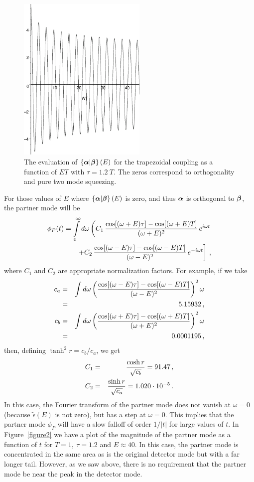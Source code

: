 \documentclass[aps,prd,showpacs,amssymb,nofootinbib,twocolumn]{revtex4}
\newcommand{\scalar}[2]{\left\{#1|#2\right\}}
\newcommand{\nn}{\nonumber\\}
\newcommand{\f}[1]{\mbox{\boldmath$#1$}}
\newcommand{\bea}{\begin{eqnarray}}
\newcommand{\eea}{\end{eqnarray}}
\begin{document}
\begin{figure}[ht]
\includegraphics[height=8cm]{fig1.eps}
\caption{\label{figure1} 
The evaluation of $\scalar{\f{\alpha}}{\f{\beta}}(E)$ for the trapezoidal 
coupling as a function of $ET$ with $\tau=1.2~T$. 
The zeros correspond to orthogonality and pure two mode squeezing.}
\end{figure}


For those  values of $E$ where $\scalar{\f{\alpha}}{\f{\beta}}(E)$ is zero, 
and thus $\f{\alpha}$ is orthogonal to $\f{\beta}$, the partner mode will be 
%
\bea
\phi_P(t)
= 
\int\limits_0^\infty d\omega
\left( 
C_1\,{\cos[(\omega+ E)\tau]-\cos[(\omega+E)T]\over(\omega+ E)^2}\,e^{i\omega t} 
\right.
\nn
\left.
+C_2\,{\cos[(\omega- E)\tau]-\cos[(\omega- E)T]\over(\omega- E)^2}\,
e^{-i\omega t}
\right]
\,,
\eea
%
where $C_1$ and $C_2$ are appropriate normalization factors. 
%
For example, if we take 
%
\bea
c_a
&=& 
\int d\omega
\left({\cos[(\omega- E)\tau]-\cos[(\omega- E)T]\over(\omega- E)^2}\right)^2
\omega
\nn
&=&
5.15932
\,,
\nn
c_b
&=& 
\int d\omega
\left({\cos[(\omega+ E)\tau]-\cos[(\omega+ E)T]\over(\omega+ E)^2}\right)^2
\omega
\nn
&=&
0.0001195
\,,
\eea
%
then, defining $\tanh^2r=c_b/c_a$, we get  
%
\bea
C_1 &=& {\cosh r\over\sqrt{c_b}} = 91.47
\,,
\nn
C_2 &=& {\sinh r\over\sqrt{c_a}} = 1.020\cdot 10^{-5}
\,.
\eea
%
In this case, the Fourier transform of the partner mode does not vanish at 
$\omega=0$ (because $\tilde\epsilon(E) $ is not zero), but has a step at 
$\omega=0$. 
%
This implies that the partner mode $\phi_P$ will have a slow falloff of order 
$1/|t|$ for large values of $t$.
%
In Figure~\ref{figure2} we have a plot of the magnitude of the partner mode 
as a function of $t$ for $T=1,~\tau=1.2$ and $E\approx 40$.
%
In this case, the partner mode is concentrated in the same area as is the 
original detector mode but with a far longer tail.
%
However, as we saw above, there is no requirement that the partner mode be
near the peak in the  detector  mode. 
\end{document}
